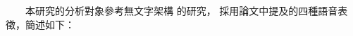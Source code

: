 

　　本研究的分析對象參考無文字架構 \cite{noauthor_textless_2021, lakhotia_generative_2021, lakhotia_generative_2021-1} 的研究，
採用論文中提及的四種語音表徵，簡述如下：

